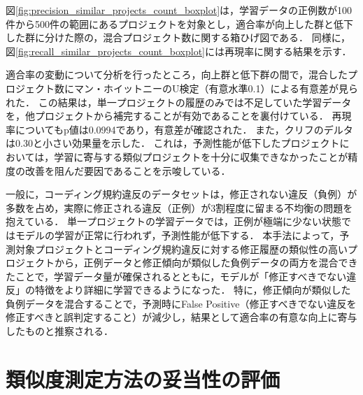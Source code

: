 \documentclass[11pt]{jreport}
\begin{document}
図\ref{fig:precision_similar_projects_count_boxplot}は，学習データの正例数が100件から500件の範囲にあるプロジェクトを対象とし，適合率が向上した群と低下した群に分けた際の，混合プロジェクト数に関する箱ひげ図である．
同様に，図\ref{fig:recall_similar_projects_count_boxplot}には再現率に関する結果を示す．

適合率の変動について分析を行ったところ，向上群と低下群の間で，混合したプロジェクト数にマン・ホイットニーのU検定（有意水準0.1）による有意差が見られた．
この結果は，単一プロジェクトの履歴のみでは不足していた学習データを，他プロジェクトから補完することが有効であることを裏付けている．
再現率についてもp値は0.0994であり，有意差が確認された．
また，クリフのデルタは0.30と小さい効果量を示した．
これは，予測性能が低下したプロジェクトにおいては，学習に寄与する類似プロジェクトを十分に収集できなかったことが精度の改善を阻んだ要因であることを示唆している．


一般に，コーディング規約違反のデータセットは，修正されない違反（負例）が多数を占め，実際に修正される違反（正例）が3割程度に留まる不均衡の問題を抱えている．
単一プロジェクトの学習データでは，正例が極端に少ない状態ではモデルの学習が正常に行われず，予測性能が低下する．
本手法によって，予測対象プロジェクトとコーディング規約違反に対する修正履歴の類似性の高いプロジェクトから，正例データと修正傾向が類似した負例データの両方を混合できたことで，学習データ量が確保されるとともに，モデルが「修正すべきでない違反」の特徴をより詳細に学習できるようになった．
特に，修正傾向が類似した負例データを混合することで，予測時にFalse Positive（修正すべきでない違反を修正すべきと誤判定すること）が減少し，結果として適合率の有意な向上に寄与したものと推察される．

\section{類似度測定方法の妥当性の評価}\label{sec:result_ruijinodatou}
\end{document}
